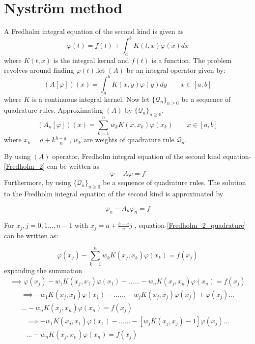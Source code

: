 \documentclass[../document.tex]{subfiles}
\begin{document}
	
\chapter{Nyström method}	

	A Fredholm integral equation of the second kind is given as
		\begin{equation} \label{Fredholm_2}
		\varphi(t) = f(t) + \int_{a}^{b} K(t,x)\varphi(x) dx 
		\end{equation} 
	where $K(t,x)$ is the integral kernal and $f(t)$ is a function. The problem revolves around finding $\varphi(t)$.let $(A)$ be an integral operator given by:
	\begin{equation*}
		(A[\varphi])(x) = \int_a^b K(x,y)\varphi(y)dy  \quad\quad x \in [a,b]
	\end{equation*} 
	where $K$ is a continuous integral kernel. Now let $\{\mathcal{Q}_n \}_{n\geq 0}$ be a sequence of quadrature rules.
	Approximating $(A)$ by  $\{\mathcal{Q}_n \}_{n\geq 0}$. 
	$$
	(A_n[\varphi])(x) = \sum_{k=1}^{n} w_k K(x,x_k)\varphi(x_k)  \quad\quad x \in [a,b]
	$$
	where $x_k = a + k\frac{b-a}{n}$ , $w_k$ are weights of quadrature rule $\mathcal{Q}_n$.
	
	By using $(A)$ operator, Fredholm integral equation of the second kind {equation-\eqref{Fredholm_2}} can be written as 
	$$
	\varphi - A\varphi = f
	$$
	Furthermore, by using  $\{\mathcal{Q}_n \}_{n\geq 0}$ be a  sequence of quadrature rules. The solution to the Fredholm integral equation of the second kind is approximated by 
	
		\begin{equation} \label{Fredholm_2_quadrature}
			\varphi_n - A_n\varphi_n = f
		\end{equation} 
	
	For $x_j , j= 0 ,1 ...,n-1$ with $x_j = a + \frac{b-a}{n}j$ , equation-\eqref{Fredholm_2_quadrature} can be written as:
	
	$$
	\varphi(x_j) -\sum_{k=1}^{n} w_k K(x_j,x_k) \varphi(x_k) = f(x_j)
	$$
	expanding the summation
	\begin{multline*}
		\implies \varphi(x_j) -w_1 K(x_j,x_1)\varphi(x_1) -...... - w_n K(x_j,x_n) \varphi(x_n) = f(x_j) 
	\end{multline*}
	\begin{multline*}
	\implies -w_1 K(x_j,x_1)\varphi(x_1) -......
	-w_j K(x_j,x_j) \varphi(x_j) + \varphi(x_j)  
	...\\...  -w_n K(x_j,x_n) \varphi(x_n) = f(x_j)  
	\end{multline*}
	\begin{multline*}
	\implies -w_1 K(x_j,x_1)\varphi(x_1) -...... 
	-\left[ w_j K(x_j,x_j) - 1\right] \varphi(x_j)  
	...\\...  -w_n K(x_j,x_n) \varphi(x_n) = f(x_j)
	\end{multline*}
\end{document}
